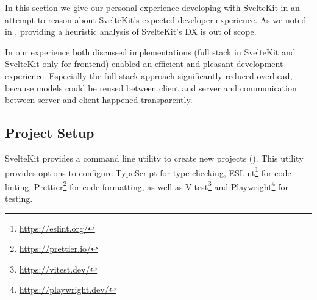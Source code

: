 
In this section we give our personal experience developing with SvelteKit in an attempt to reason about SvelteKit's expected developer experience. As we noted in , providing a heuristic analysis of SvelteKit's DX is out of scope.

In our experience both discussed implementations (full stack in SvelteKit and SvelteKit only for frontend) enabled an efficient and pleasant development experience. Especially the full stack approach significantly reduced overhead, because models could be reused between client and server and communication between server and client happened transparently.


\subsection{Project Setup}

SvelteKit provides a command line utility to create new projects (). This utility provides options to configure TypeScript for type checking, ESLint\footnote{\url{https://eslint.org/}} for code linting, Prettier\footnote{\url{https://prettier.io/}} for code formatting, as well as Vitest\footnote{\url{https://vitest.dev/}} and Playwright\footnote{\url{https://playwright.dev/}} for testing. 



